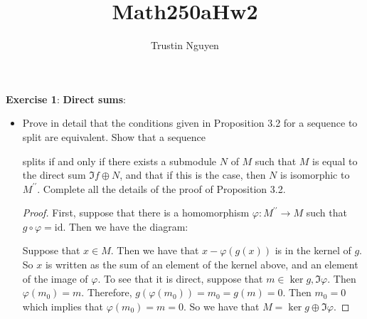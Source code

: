 \documentclass{article}
\title{Math250aHw2}
\author{Trustin Nguyen}
\begin{document}
    \maketitle

\reversemarginpar

\textbf{Exercise 1}: \textbf{Direct sums}:
    \begin{itemize}
        \item Prove in detail that the conditions given in Proposition 3.2 for a sequence to split are equivalent. Show that a sequence 
            \begin{center}
            \end{center}
        splits if and only if there exists a submodule $N$ of $M$ such that $M$ is equal to the direct sum $\Im{f} \oplus N$, and that if this is the case, then $N$ is isomorphic to $M^{\prime\prime}$. Complete all the details of the proof of Proposition 3.2.
    \begin{proof}
        First, suppose that there is a homomorphism $\varphi: M^{\prime\prime} \rightarrow M$ such that $g \circ \varphi = \text{id}$. Then we have the diagram:
            \begin{center}
            \end{center}
        Suppose that $x \in M$. Then we have that $x - \varphi(g(x))$ is in the kernel of $g$. So $x$ is written as the sum of an element of the kernel above, and an element of the image of $\varphi$. To see that it is direct, suppose that $m \in \ker{g}, \Im{\varphi}$. Then $\varphi(m_{0}) = m$. Therefore, $g(\varphi(m_{0})) = m_{0} = g(m) = 0$. Then $m_{0} = 0$ which implies that $\varphi(m_{0}) = m = 0$. So we have that $M = \ker{g} \oplus \Im{\varphi}$. 


\end{proof}
\end{itemize}
\end{document}
